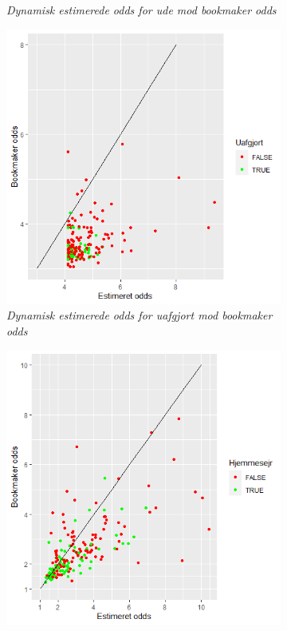 \documentclass[11pt,a4paper]{article}
\begin{document}
\begin{figure}[h!]
\begin{subfigure}[b]{0.4\linewidth}
    \caption{\textit{Dynamisk estimerede odds for ude mod bookmaker odds}}
    \label{fig:DynUdeOdds}
  \end{subfigure}
    \hspace{0.2cm}
    \begin{subfigure}[b]{0.4\textwidth}
    \includegraphics[width=\textwidth]{DynUafgjortOdds.png}
    \caption{\textit{Dynamisk estimerede odds for uafgjort mod bookmaker odds}}
    \label{fig:DynUafgjortOdds}  
    \end{subfigure}
      \hspace{0.2cm}
  \begin{subfigure}[b]{0.4\linewidth}
\includegraphics[width=\textwidth]{StatiskHjemmeOdds.png}

\end{subfigure}
\end{figure}
\end{document}
